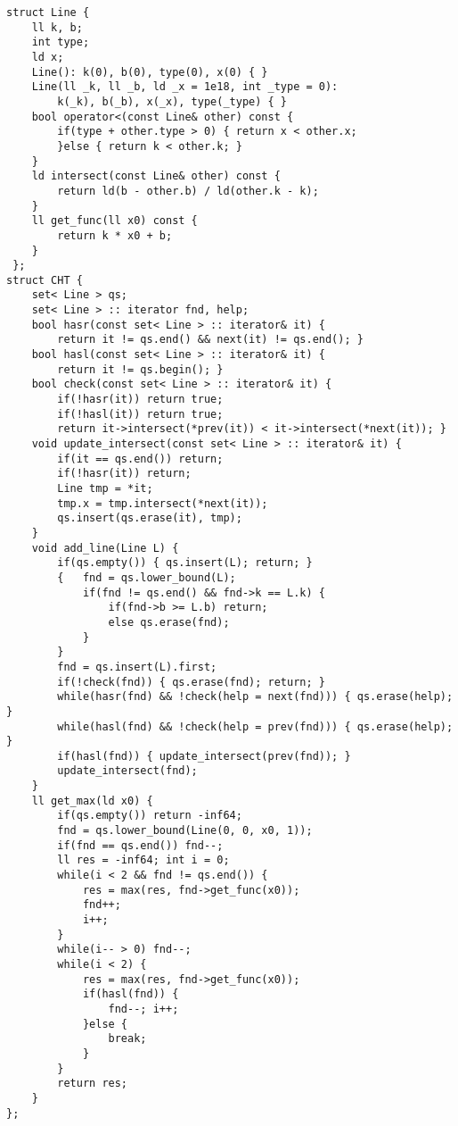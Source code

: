 \documentclass[12pt]{article}
\begin{document}
\begin{verbatim}
struct Line {
    ll k, b;
    int type;
    ld x;
    Line(): k(0), b(0), type(0), x(0) { }
    Line(ll _k, ll _b, ld _x = 1e18, int _type = 0): 
        k(_k), b(_b), x(_x), type(_type) { }
    bool operator<(const Line& other) const {
        if(type + other.type > 0) { return x < other.x;
        }else { return k < other.k; }
    }
    ld intersect(const Line& other) const {
        return ld(b - other.b) / ld(other.k - k);
    }
    ll get_func(ll x0) const {
        return k * x0 + b;
    }
 };
struct CHT {
    set< Line > qs;
    set< Line > :: iterator fnd, help;
    bool hasr(const set< Line > :: iterator& it) {
        return it != qs.end() && next(it) != qs.end(); }
    bool hasl(const set< Line > :: iterator& it) {
        return it != qs.begin(); }
    bool check(const set< Line > :: iterator& it) {
        if(!hasr(it)) return true;
        if(!hasl(it)) return true;
        return it->intersect(*prev(it)) < it->intersect(*next(it)); }
    void update_intersect(const set< Line > :: iterator& it) {
        if(it == qs.end()) return;
        if(!hasr(it)) return;
        Line tmp = *it;
        tmp.x = tmp.intersect(*next(it));
        qs.insert(qs.erase(it), tmp);
    }
    void add_line(Line L) {
        if(qs.empty()) { qs.insert(L); return; }
        {   fnd = qs.lower_bound(L);
            if(fnd != qs.end() && fnd->k == L.k) {
                if(fnd->b >= L.b) return;
                else qs.erase(fnd);
            } 
        }
        fnd = qs.insert(L).first;
        if(!check(fnd)) { qs.erase(fnd); return; }
        while(hasr(fnd) && !check(help = next(fnd))) { qs.erase(help); }
        while(hasl(fnd) && !check(help = prev(fnd))) { qs.erase(help); }
        if(hasl(fnd)) { update_intersect(prev(fnd)); }
        update_intersect(fnd);
    }
    ll get_max(ld x0) {
        if(qs.empty()) return -inf64;
        fnd = qs.lower_bound(Line(0, 0, x0, 1));
        if(fnd == qs.end()) fnd--;
        ll res = -inf64; int i = 0;
        while(i < 2 && fnd != qs.end()) {
            res = max(res, fnd->get_func(x0));
            fnd++;
            i++;
        }
        while(i-- > 0) fnd--;
        while(i < 2) {
            res = max(res, fnd->get_func(x0));
            if(hasl(fnd)) {
                fnd--; i++;
            }else {
                break;
            }
        }
        return res;
    }
};
\end{verbatim}
\end{document}
